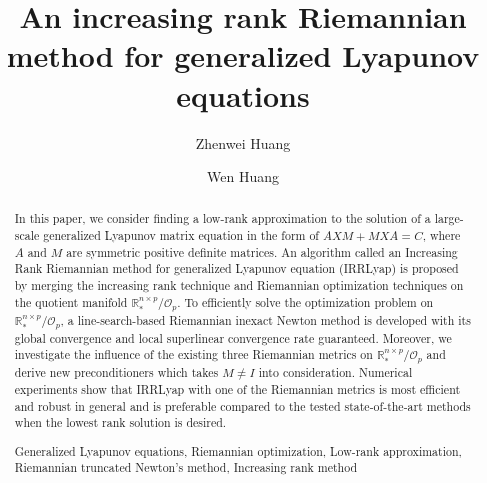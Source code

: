 \documentclass[11pt]{article}
\numberwithin{equation}{section}
\begin{document}
\title{An increasing rank Riemannian method for generalized Lyapunov equations 
}
\author[1]{Zhenwei Huang}
\author[2]{Wen Huang}


\maketitle

\begin{abstract}
In this paper, we consider finding a low-rank approximation to the solution of a large-scale generalized Lyapunov matrix equation in the form of $A X M + M X A = C$, where $A$ and $M$ are symmetric positive definite matrices. An algorithm called an Increasing Rank Riemannian method for generalized Lyapunov equation (IRRLyap) is proposed by merging the increasing rank technique and Riemannian optimization techniques on the quotient manifold $\mathbb{R}_*^{n \times p} / \mathcal{O}_p$. To efficiently solve the optimization problem on $\mathbb{R}_*^{n \times p} / \mathcal{O}_p$, a line-search-based Riemannian inexact Newton method is developed with its global convergence and local superlinear convergence rate guaranteed. Moreover, we investigate the influence of the existing three Riemannian metrics on $\mathbb{R}_*^{n \times p} / \mathcal{O}_p$ and derive new preconditioners which takes $M \neq I$ into consideration. Numerical experiments show that IRRLyap with one of the Riemannian metrics is most efficient and robust in general and is preferable compared to the tested state-of-the-art methods when the lowest rank solution is desired.

\begin{keywords}

Generalized Lyapunov equations, Riemannian optimization, Low-rank approximation, Riemannian truncated Newton's method, Increasing rank method
\end{keywords}

\end{abstract}


\end{document}
